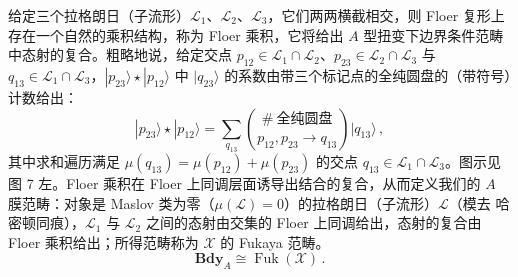 给定三个拉格朗日（子流形）$\mathcal{L}_1$、$\mathcal{L}_2$、$\mathcal{L}_3$，它们两两横截相交，则 Floer 复形上存在一个自然的乘积结构，称为 Floer 乘积，它将给出 $A$ 型扭变下边界条件范畴中态射的复合。粗略地说，给定交点 $p_{12}\in\mathcal{L}_1\cap\mathcal{L}_2$、$p_{23}\in\mathcal{L}_2\cap\mathcal{L}_3$ 与 $q_{13}\in\mathcal{L}_1\cap\mathcal{L}_3$，$|p_{23}\rangle\star|p_{12}\rangle$ 中 $|q_{23}\rangle$ 的系数由带三个标记点的全纯圆盘的（带符号）计数给出：
\begin{equation}\tag{2.52}
|p_{23}\rangle\star|p_{12}\rangle = \sum_{q_{13}}
\binom{\#\ \text{全纯圆盘}}{p_{12},p_{23}\to q_{13}}|q_{13}\rangle\,,
\end{equation}
其中求和遍历满足 $\mu(q_{13})=\mu(p_{12})+\mu(p_{23})$ 的交点 $q_{13}\in\mathcal{L}_1\cap\mathcal{L}_3$。图示见图 7 左。Floer 乘积在 Floer 上同调层面诱导出结合的复合，从而定义我们的 $A$ 膜范畴：对象是 Maslov 类为零（$\mu(\mathcal{L})=0$）的拉格朗日（子流形）$\mathcal{L}$（模去 哈密顿同痕），$\mathcal{L}_1$ 与 $\mathcal{L}_2$ 之间的态射由交集的 Floer 上同调给出，态射的复合由 Floer 乘积给出；所得范畴称为 $\mathcal{X}$ 的 Fukaya 范畴。
\begin{equation}\tag{2.53}
\mathbf{Bdy}_A \cong \operatorname{Fuk}(\mathcal{X})\,.
\end{equation}

